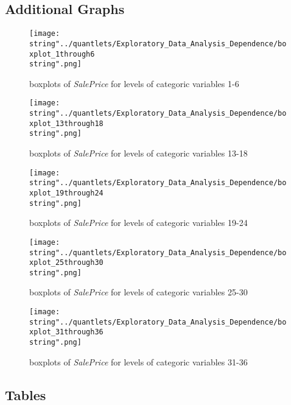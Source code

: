 \subsection{Additional Graphs}

\begin{figure}[H]
\centering
\texttt{[image: \\string"../quantlets/Exploratory\_Data\_Analysis\_Dependence/boxplot\_1through6\\string".png]}
\caption{boxplots of \textit{SalePrice} for levels of categoric variables 1-6}
\label{fig:box1to6}
\end{figure}

\begin{figure}[H]
\centering
\texttt{[image: \\string"../quantlets/Exploratory\_Data\_Analysis\_Dependence/boxplot\_13through18\\string".png]}
\caption{boxplots of \textit{SalePrice} for levels of categoric variables 13-18}
\label{fig:box13to18}
\end{figure}

\begin{figure}[H]
\centering
\texttt{[image: \\string"../quantlets/Exploratory\_Data\_Analysis\_Dependence/boxplot\_19through24\\string".png]}
\caption{boxplots of \textit{SalePrice} for levels of categoric variables 19-24}
\label{fig:box19to24}
\end{figure}

\begin{figure}[H]
\centering
\texttt{[image: \\string"../quantlets/Exploratory\_Data\_Analysis\_Dependence/boxplot\_25through30\\string".png]}
\caption{boxplots of \textit{SalePrice} for levels of categoric variables 25-30}
\label{fig:box25to30}
\end{figure}

\begin{figure}[H]
\centering
\texttt{[image: \\string"../quantlets/Exploratory\_Data\_Analysis\_Dependence/boxplot\_31through36\\string".png]}
\caption{boxplots of \textit{SalePrice} for levels of categoric variables 31-36}
\label{fig:box31to36}
\end{figure}

\subsection{Tables}







